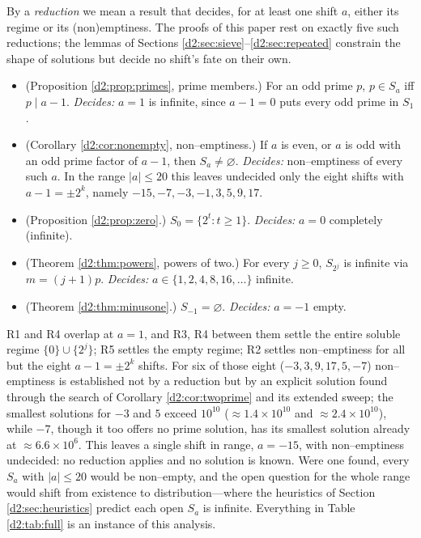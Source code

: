 \documentclass[a4paper]{article}
\theoremstyle{plain}
\theoremstyle{definition}
\theoremstyle{remark}
\newcommand{\dvd}{\mid}
\newcommand{\Sa}{S_a}
\begin{document}
By a \emph{reduction} we mean a result that decides, for at least one shift $a$, either its regime or its (non)emptiness. The proofs of this paper rest on exactly five such reductions; the lemmas of Sections \ref{d2:sec:sieve}--\ref{d2:sec:repeated} constrain the shape of solutions but decide no shift's fate on their own.

\begin{itemize}
\item[\textbf{R1}] (Proposition \ref{d2:prop:primes}, prime members.) For an odd prime $p$, $p\in\Sa$ iff $p\dvd a-1$. \emph{Decides:} $a=1$ is infinite, since $a-1=0$ puts every odd prime in $S_1$.
\item[\textbf{R2}] (Corollary \ref{d2:cor:nonempty}, non--emptiness.) If $a$ is even, or $a$ is odd with an odd prime factor of $a-1$, then $\Sa\ne\varnothing$. \emph{Decides:} non--emptiness of every such $a$. In the range $|a|\le20$ this leaves undecided only the eight shifts with $a-1=\pm2^{k}$, namely $-15,-7,-3,-1,3,5,9,17$.
\item[\textbf{R3}] (Proposition \ref{d2:prop:zero}.) $S_0=\{2^{t}:t\ge1\}$. \emph{Decides:} $a=0$ completely (infinite).
\item[\textbf{R4}] (Theorem \ref{d2:thm:powers}, powers of two.) For every $j\ge0$, $S_{2^{j}}$ is infinite via $m=(j+1)p$. \emph{Decides:} $a\in\{1,2,4,8,16,\dots\}$ infinite.
\item[\textbf{R5}] (Theorem \ref{d2:thm:minusone}.) $S_{-1}=\varnothing$. \emph{Decides:} $a=-1$ empty.
\end{itemize}

R1 and R4 overlap at $a=1$, and R3, R4 between them settle the entire soluble regime $\{0\}\cup\{2^{j}\}$; R5 settles the empty regime; R2 settles non--emptiness for all but the eight $a-1=\pm2^{k}$ shifts. For six of those eight ($-3,3,9,17,5,-7$) non--emptiness is established not by a reduction but by an explicit solution found through the search of Corollary \ref{d2:cor:twoprime} and its extended sweep; the smallest solutions for $-3$ and $5$ exceed $10^{10}$ ($\approx1.4\times10^{10}$ and $\approx2.4\times10^{10}$), while $-7$, though it too offers no prime solution, has its smallest solution already at $\approx6.6\times10^{6}$. This leaves a single shift in range, $a=-15$, with non--emptiness undecided: no reduction applies and no solution is known. Were one found, every $S_a$ with $|a|\le20$ would be non--empty, and the open question for the whole range would shift from existence to distribution---where the heuristics of Section \ref{d2:sec:heuristics} predict each open $S_a$ is infinite. Everything in Table \ref{d2:tab:full} is an instance of this analysis.
\end{document}
